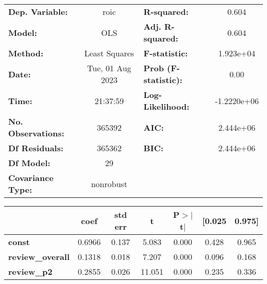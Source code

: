 \begin{center}
\begin{tabular}{lclc}
\toprule
\textbf{Dep. Variable:}                                               &       roic       & \textbf{  R-squared:         } &      0.604   \\
\textbf{Model:}                                                       &       OLS        & \textbf{  Adj. R-squared:    } &      0.604   \\
\textbf{Method:}                                                      &  Least Squares   & \textbf{  F-statistic:       } &  1.923e+04   \\
\textbf{Date:}                                                        & Tue, 01 Aug 2023 & \textbf{  Prob (F-statistic):} &      0.00    \\
\textbf{Time:}                                                        &     21:37:59     & \textbf{  Log-Likelihood:    } & -1.2220e+06  \\
\textbf{No. Observations:}                                            &      365392      & \textbf{  AIC:               } &  2.444e+06   \\
\textbf{Df Residuals:}                                                &      365362      & \textbf{  BIC:               } &  2.444e+06   \\
\textbf{Df Model:}                                                    &          29      & \textbf{                     } &              \\
\textbf{Covariance Type:}                                             &    nonrobust     & \textbf{                     } &              \\
\bottomrule
\end{tabular}
\begin{tabular}{lcccccc}
                                                                      & \textbf{coef} & \textbf{std err} & \textbf{t} & \textbf{P$> |$t$|$} & \textbf{[0.025} & \textbf{0.975]}  \\
\midrule
\textbf{const}                                                        &       0.6966  &        0.137     &     5.083  &         0.000        &        0.428    &        0.965     \\
\textbf{review\_overall}                                              &       0.1318  &        0.018     &     7.207  &         0.000        &        0.096    &        0.168     \\
\textbf{review\_p2}                                                   &       0.2855  &        0.026     &    11.051  &         0.000        &        0.235    &        0.336     \\

\end{tabular}
\end{center}
